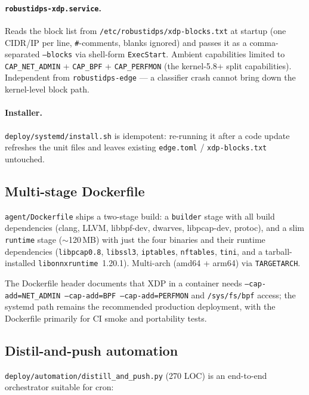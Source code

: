 \documentclass[11pt,a4paper]{article}
\begin{document}
\paragraph{\texttt{robustidps-xdp.service}.}
Reads the block list from \texttt{/etc/robustidps/xdp-blocks.txt} at
startup (one CIDR/IP per line, \texttt{\#}-comments, blanks ignored)
and passes it as a comma-separated \texttt{--blocks} via shell-form
\texttt{ExecStart}.  Ambient capabilities limited to
\texttt{CAP\_NET\_ADMIN} + \texttt{CAP\_BPF} + \texttt{CAP\_PERFMON}
(the kernel-5.8+ split capabilities).  Independent from
\texttt{robustidps-edge} --- a classifier crash cannot bring down the
kernel-level block path.

\paragraph{Installer.}
\texttt{deploy/systemd/install.sh} is idempotent: re-running it after
a code update refreshes the unit files and leaves existing
\texttt{edge.toml} / \texttt{xdp-blocks.txt} untouched.

\subsection{Multi-stage Dockerfile}

\texttt{agent/Dockerfile} ships a two-stage build: a \texttt{builder}
stage with all build dependencies (clang, LLVM, libbpf-dev,
dwarves, libpcap-dev, protoc), and a slim \texttt{runtime} stage
($\sim$120\,MB) with just the four binaries and their runtime
dependencies (\texttt{libpcap0.8}, \texttt{libssl3}, \texttt{iptables},
\texttt{nftables}, \texttt{tini}, and a tarball-installed
\texttt{libonnxruntime}~1.20.1).  Multi-arch (amd64 + arm64) via
\texttt{TARGETARCH}.

The Dockerfile header documents that XDP in a container needs
\texttt{--cap-add=NET\_ADMIN --cap-add=BPF --cap-add=PERFMON} and
\texttt{/sys/fs/bpf} access; the systemd path remains the
recommended production deployment, with the Dockerfile primarily
for CI smoke and portability tests.

\subsection{Distil-and-push automation}

\texttt{deploy/automation/distill\_and\_push.py} (270 LOC) is an
end-to-end orchestrator suitable for cron:
\end{document}

